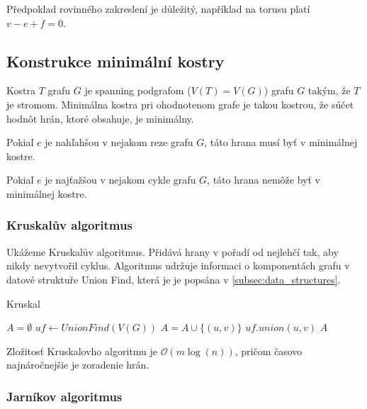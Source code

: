 \begin{note}
    Předpoklad rovinného zakreslení je důležitý,
    například na torusu platí $v - e + f = 0$.
\end{note}

\subsection{Konstrukce minimální kostry}

Kostra $T$ grafu $G$ je spanning podgrafom ($V(T)=V(G)$) grafu $G$ takým,
že $T$ je stromom. Minimálna kostra pri ohodnotenom grafe je takou kostrou,
že súčet hodnôt hrán, ktoré obsahuje, je minimálny.

\begin{theorem}
	Pokiaľ $e$ je nahľahšou v nejakom reze grafu $G$, táto hrana musí
	byť v minimálnej kostre.
\end{theorem}

\begin{theorem}
	Pokiaľ $e$ je najťažšou v nejakom cykle grafu $G$, táto hrana nemôže
	byť v minimálnej kostre.
\end{theorem}

\subsubsection{Kruskalův algoritmus}

Ukážeme Kruskalův algoritmus. Přidává hrany v pořadí od nejlehčí tak,
aby nikdy nevytvořil cyklus.
Algoritmus udržuje informaci o komponentách grafu v datové struktuře
Union Find, která je je popsána v
\autoref{subsec:data_structures}.

\begin{algorithm}
\caption{Kruskal}
\begin{algorithmic}[1]
    \State $A = \emptyset$
    \State $uf \gets UnionFind(V(G))$
            \State $A = A \cup \{(u,v)\}$
            \State $uf.union(u, v)$
        \EndIf
    \EndFor
    \State \Return $A$
\EndFunction
\end{algorithmic}
\end{algorithm}

Zložitosť Kruskalovho algoritmu je $\mathcal{O}(m \log(n))$, pričom
časovo najnáročnejšie je zoradenie hrán.

\subsubsection{Jarníkov algoritmus}

